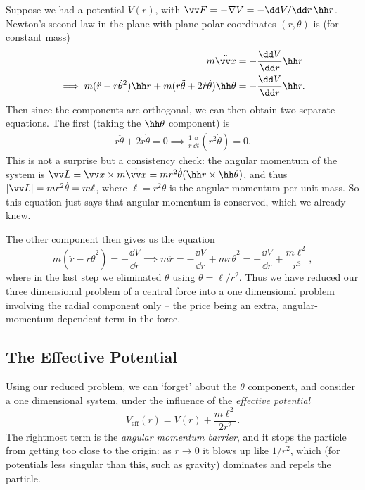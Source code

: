 Suppose we had a potential $V(r)$, with $\vv F = - \nabla V = - \dd V/\dd r \, \hh r$. Newton's second law in the plane with plane polar coordinates $(r, \theta)$ is (for constant mass)
\begin{align*}
	m \ddot{\vv x} &= - \frac{\dd V}{\dd r} \hh r \\
\implies m (\ddot{r} - r \dot{\theta}^2) \hh r + m (r \ddot{\theta} + 2 \dot{r} \dot{\theta}) \hh \theta &= -\frac{\dd V}{\dd r} \hh r.
\end{align*}
Then since the components are orthogonal, we can then obtain two separate equations. The first (taking the $\hh \theta$ component) is
\begin{align*}
	r \ddot{\theta} + 2 \dot{r} \dot{\theta} = 0 \implies \frac{1}{r} \frac{\dd}{\dd t}(r^2 \dot{\theta}) = 0.
\end{align*}
This is not a surprise but a consistency check: the angular momentum of the system is $\vv L = \vv x \times m \dot{\vv x} = m r^2 \dot{\theta} (\hh r \times \hh \theta)$, and thus $|\vv L| = m r^2 \dot{\theta} = m \ell$, where $\ell = r^2 \dot\theta$ is the angular momentum per unit mass. So this equation just says that angular momentum is conserved, which we already knew.

The other component then gives us the equation
$$
m(\ddot{r} - r \dot{\theta}^2) = - \frac{\dd V}{\dd r} \implies m \ddot{r} = -\frac{\dd V}{\dd r} + m r \dot{\theta}^2 = - \frac{\dd V}{\dd r} + \frac{m\ell^2}{r^3},
$$
where in the last step we eliminated $\dot\theta$ using $\dot\theta = \ell/r^2$. Thus we have reduced our three dimensional problem of a central force into a one dimensional problem involving the radial component only -- the price being an extra, angular-momentum-dependent term in the force.

\subsection{The Effective Potential}

Using our reduced problem, we can `forget' about the $\theta$ component, and consider a one dimensional system, under the influence of the \emph{effective potential}
$$
V_{\text{eff}}(r) = V(r) + \frac{m \ell^2}{2r^2}.
$$
The rightmost term is the \emph{angular momentum barrier}, and it stops the particle from getting too close to the origin: as $r \to 0$ it blows up like $1/r^2$, which (for potentials less singular than this, such as gravity) dominates and repels the particle.

